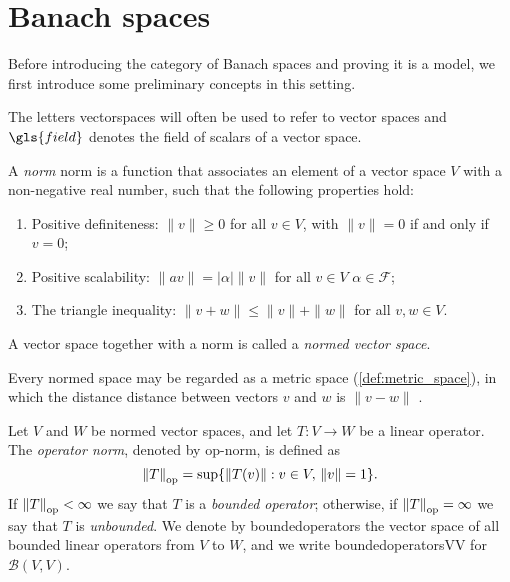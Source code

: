 \section{Banach spaces}

Before introducing the category of Banach spaces and proving it is a model, we first introduce some preliminary concepts in this setting. 

The letters \gls{vectorspaces} will often be used to refer to vector spaces and $\gls{field}$ denotes the field of scalars of a vector space.




\begin{definition} \label{def:norm}
  A \emph{norm} \gls{norm} is a function that associates an element of a vector space $V$ with a non-negative real number, such that the following properties hold:
  \begin{enumerate}
    \item Positive definiteness: $\|v\| \geq 0$ for all $v \in V$, with $\|v\| = 0$ if and only if $v = 0$;
    \item Positive scalability: $\|av\| = |\alpha|\|v\|$ for all $v \in V$  $\alpha \in \mathcal{F}$;
    \item The triangle inequality: $\|v + w\| \leq \|v\| + \|w\|$ for all $v, w \in V$.
  \end{enumerate}
\end{definition}

\begin{definition} \label{def:normed_space}
A vector space together with a norm is called a \emph{normed vector space}.
\end{definition}


Every normed space may be regarded as a metric space (\autoref{def:metric_space}), in which the
distance \gls{distance} between vectors $v$ and $w$ is $\|v-w\|$ .

\begin{definition} \label{def:op_norm}
Let \( V \) and \( W \) be normed vector spaces, and let \( T: V \rightarrow W \) be a linear operator. The \emph{operator norm}, denoted by \gls{op-norm}, is defined as
\[
\left\lVert T \right\rVert_{\text{op}}= \sup \{ \left\lVert T(v) \right\rVert : v \in V, \, \left\lVert v \right\rVert = 1 \}.
\]
If \( \left\lVert T \right\rVert_{\text{op}} < \infty \) we say that \( T \) is a \emph{bounded operator}; otherwise, if \( \left\lVert T \right\rVert_{\text{op}} = \infty \) we say that \( T \) is \emph{unbounded}. We denote by \gls{boundedoperators} the vector space of all bounded linear operators from \( V \) to \( W \), and we write  \gls{boundedoperatorsVV} for \( \mathcal{B}(V, V) \).
\end{definition}

